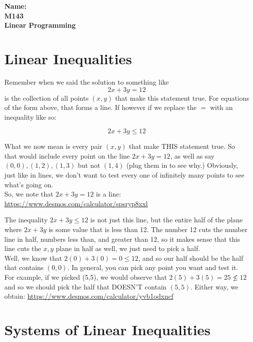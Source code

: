 \documentclass[10pt]{article}
\theoremstyle{definition}
\begin{document}
%

{\bf Name:} \hrulefill\hrulefill\hrulefill\\
{\bf M143} \qquad \qquad \\
{\bf Linear Programming}\\ %



\section{Linear Inequalities}

Remember when we said the solution to something like $$2x+3y=12$$ is the collection of all points $(x,y)$ that make this statement true.  For equations of the form above, that forms a line.  If however if we replace the $=$ with an inequality like so:

$$2x+3y\leq12$$

What we now mean is every pair $(x,y)$ that make THIS statement true.  So that would include every point on the line $2x+3y=12$, as well as say $(0,0), (1,2), (1,3)$ but not $(1,4)$ (plug them in to see why.)  Obviously, just like in lines, we don't want to test every one of infinitely many points to see what's going on.\\

So, we note that $2x+3y=12$ is a line:  \url{https://www.desmos.com/calculator/spsryp8xxl}

The inequality $2x+3y\leq12$ is not just this line, but the entire half of the plane where $2x+3y$ is some value that is less than 12.  The number 12 cuts the number line in half, numbers less than, and greater than 12, so it makes sense that this line cuts the $x,y$ plane in half as well, we just need to pick a half.\\

Well, we know that $2(0)+3(0)=0\leq12$, and so our half should be the half that contains $(0,0)$.  In general, you can pick any point you want and test it.  For example, if we picked (5,5), we would observe that $2(5)+3(5)=25\not\leq 12$ and so we should pick the half that DOESN'T contain $(5,5)$.  Either way, we obtain: \url{https://www.desmos.com/calculator/yvb1odxncf}


\section{Systems of Linear Inequalities}
\end{document}
